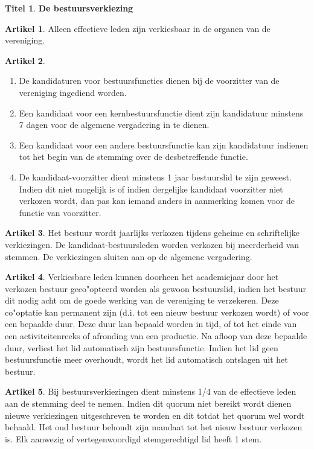 \documentclass[a4paper,10pt]{article}
\theoremstyle{definition}
\newtheorem{titel}{\newline\Large Titel}
\newtheorem{artikel}{\large Artikel}
\newcommand{\ttext}[1]{\Large \textbf{#1} \normalsize}
\newcommand{\ttextcr}{\hfill\newline}
\newcommand{\ttextenum}{\mbox{}}
\begin{document}
\begin{titel}\ttext{De bestuursverkiezing}

  \begin{artikel}\ttextcr
    Alleen effectieve leden zijn verkiesbaar in de organen van de vereniging.
  \end{artikel}

  \begin{artikel}\ttextenum
    \begin{enumerate}
      \item
        De kandidaturen voor bestuursfuncties dienen bij de voorzitter van de vereniging ingediend worden.
      \item
        Een kandidaat voor een kernbestuursfunctie dient zijn kandidatuur minstens 7 dagen voor de algemene vergadering in te dienen.
      \item
        Een kandidaat voor een andere bestuursfunctie kan zijn kandidatuur indienen tot het begin van de stemming over de desbetreffende functie.
      \item
        De kandidaat-voorzitter dient minstens 1 jaar bestuurslid te zijn geweest.
        Indien dit niet mogelijk is of indien dergelijke kandidaat voorzitter niet verkozen wordt, dan pas kan iemand anders in aanmerking komen voor de functie van voorzitter.
    \end{enumerate}
  \end{artikel}

  \begin{artikel}\ttextcr
    Het bestuur wordt jaarlijks verkozen tijdens geheime en schriftelijke verkiezingen.
    De kandidaat-bestuursleden worden verkozen bij meerderheid van stemmen.
    De verkiezingen sluiten aan op de algemene vergadering.
  \end{artikel}

  \begin{artikel}\label{bestuur-cooptatie}\ttextcr
    Verkiesbare leden kunnen doorheen het academiejaar door het verkozen bestuur geco"opteerd worden als gewoon bestuurslid, indien het bestuur dit nodig acht om de goede werking van de vereniging te verzekeren.
    Deze co"optatie kan permanent zijn (d.i. tot een nieuw bestuur verkozen wordt) of voor een bepaalde duur.
    Deze duur kan bepaald worden in tijd, of tot het einde van een activiteitenreeks of afronding van een productie.
    Na afloop van deze bepaalde duur, verliest het lid automatisch zijn bestuursfunctie.
    Indien het lid geen bestuursfunctie meer overhoudt, wordt het lid automatisch ontslagen uit het bestuur.%
  \end{artikel}

  \begin{artikel}\ttextcr
    Bij bestuursverkiezingen dient minstens 1/4 van de effectieve leden aan de stemming deel te nemen.
    Indien dit quorum niet bereikt wordt dienen nieuwe verkiezingen uitgeschreven te worden en dit totdat het quorum wel wordt behaald.
    Het oud bestuur behoudt zijn mandaat tot het nieuw bestuur verkozen is.
    Elk aanwezig of vertegenwoordigd stemgerechtigd lid heeft 1 stem.
  \end{artikel}

\end{titel}
\end{document}
